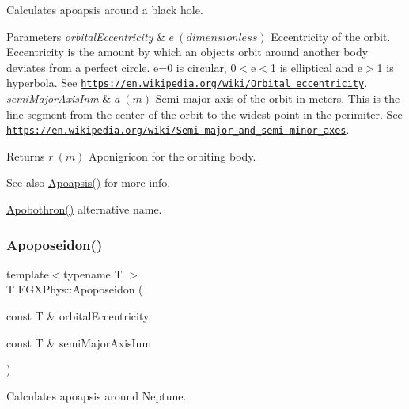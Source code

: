 Calculates apoapsis around a black hole. 


\begin{DoxyParams}{Parameters}
{\em orbital\+Eccentricity} & $ e\ (dimensionless)$ Eccentricity of the orbit. Eccentricity is the amount by which an objects orbit around another body deviates from a perfect circle. e=0 is circular, 0$<$e$<$1 is elliptical and e$>$1 is hyperbola. See \href{https://en.wikipedia.org/wiki/Orbital_eccentricity}{\tt https\+://en.\+wikipedia.\+org/wiki/\+Orbital\+\_\+eccentricity}. \\
\hline
{\em semi\+Major\+Axis\+Inm} & $ a\ (m)$ Semi-\/major axis of the orbit in meters. This is the line segment from the center of the orbit to the widest point in the perimiter. See \href{https://en.wikipedia.org/wiki/Semi-major_and_semi-minor_axes}{\tt https\+://en.\+wikipedia.\+org/wiki/\+Semi-\/major\+\_\+and\+\_\+semi-\/minor\+\_\+axes}. \\
\hline
\end{DoxyParams}
\begin{DoxyReturn}{Returns}
$ r\ (m)$ Aponigricon for the orbiting body. 
\end{DoxyReturn}
\begin{DoxySeeAlso}{See also}
\mbox{\hyperlink{group___e_g_x_phys-_apoapsis_gafd08a2d1d64886e7bb9bcb7ff65bc3ea}{Apoapsis()}} for more info. 

\mbox{\hyperlink{group___e_g_x_phys-_apoapsis_ga95add3a7ff4e799bff0a508c9bdaa408}{Apobothron()}} alternative name. 
\end{DoxySeeAlso}
\mbox{\label{group___e_g_x_phys-_apoapsis_ga985afde0717360cffc6b5c17c9a42ac8}} 
\subsubsection{\texorpdfstring{Apoposeidon()}{Apoposeidon()}}
{\footnotesize\ttfamily template$<$typename T $>$ \\
T E\+G\+X\+Phys\+::\+Apoposeidon (\begin{DoxyParamCaption}\item[{const T \&}]{orbital\+Eccentricity,  }\item[{const T \&}]{semi\+Major\+Axis\+Inm }\end{DoxyParamCaption})}



Calculates apoapsis around Neptune. 


